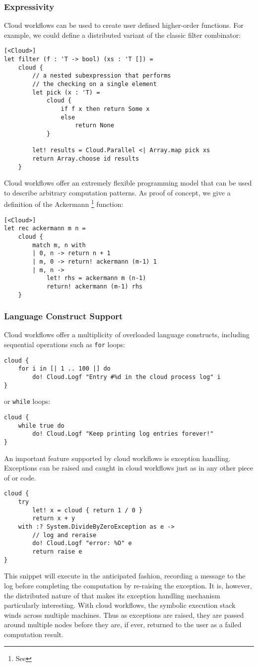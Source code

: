 \subsubsection*{Expressivity}
%
Cloud workflows can be used to create user defined higher-order functions. 
For example, we could define a distributed variant of the classic filter combinator:
\begin{lstlisting}
[<Cloud>]
let filter (f : 'T -> bool) (xs : 'T []) =
    cloud {
		// a nested subexpression that performs
		// the checking on a single element
		let pick (x : 'T) =
			cloud {
				if f x then return Some x
				else
					return None
			}

        let! results = Cloud.Parallel <| Array.map pick xs
		return Array.choose id results
    }
\end{lstlisting}
%
%
Cloud workflows offer an extremely flexible programming model that can
be used to describe arbitrary computation patterns.
As proof of concept, we give a definition of the Ackermann%
\footnote{See } function:
\begin{lstlisting}
[<Cloud>]
let rec ackermann m n =
    cloud {
        match m, n with
        | 0, n -> return n + 1
        | m, 0 -> return! ackermann (m-1) 1
        | m, n ->
            let! rhs = ackermann m (n-1)
            return! ackermann (m-1) rhs
    }
\end{lstlisting}
%
\subsubsection*{Language Construct Support}
%
Cloud workflows offer a multiplicity of overloaded language constructs,
including sequential operations such as \texttt{for} loops:
\begin{lstlisting}
cloud {
    for i in [| 1 .. 100 |] do
        do! Cloud.Logf "Entry #%d in the cloud process log" i
}
\end{lstlisting}
or \texttt{while} loops:
\begin{lstlisting}
cloud {
    while true do
        do! Cloud.Logf "Keep printing log entries forever!"
}
\end{lstlisting}
%
An important feature supported by cloud workflows is exception handling. 
Exceptions can be raised and caught in cloud workflows just as in any other piece 
of \fsharp{} or \dotnet{} code. 
\begin{lstlisting}
cloud {
    try
        let! x = cloud { return 1 / 0 }
        return x + y
    with :? System.DivideByZeroException as e ->
        // log and reraise
        do! Cloud.Logf "error: %O" e
        return raise e
}
\end{lstlisting}
This snippet will execute in the anticipated fashion, recording a message to the log
before completing the computation by re-raising the exception.
It is, however, the distributed nature of \mbrace{} that makes its exception 
handling mechanism particularly interesting. With cloud workflows, the symbolic execution
stack winds across multiple machines. Thus as exceptions are raised, they are passed
around multiple nodes before they are, if ever, returned to the user as a failed
computation result.

